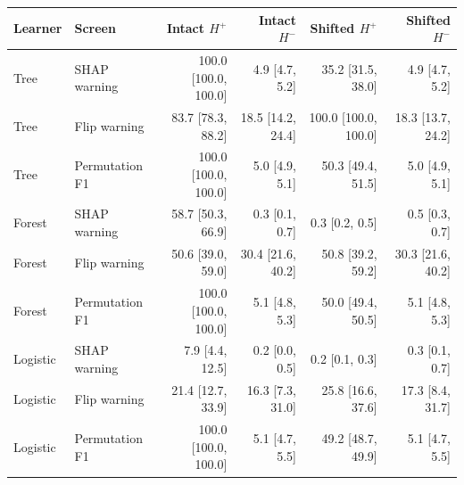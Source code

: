 \begin{tabular}{llrrrr}
\toprule
Learner & Screen & Intact $H^+$ & Intact $H^-$ & Shifted $H^+$ & Shifted $H^-$ \\
\midrule
Tree & SHAP warning & 100.0 [100.0, 100.0] & 4.9 [4.7, 5.2] & 35.2 [31.5, 38.0] & 4.9 [4.7, 5.2] \\
Tree & Flip warning & 83.7 [78.3, 88.2] & 18.5 [14.2, 24.4] & 100.0 [100.0, 100.0] & 18.3 [13.7, 24.2] \\
Tree & Permutation F1 & 100.0 [100.0, 100.0] & 5.0 [4.9, 5.1] & 50.3 [49.4, 51.5] & 5.0 [4.9, 5.1] \\
Forest & SHAP warning & 58.7 [50.3, 66.9] & 0.3 [0.1, 0.7] & 0.3 [0.2, 0.5] & 0.5 [0.3, 0.7] \\
Forest & Flip warning & 50.6 [39.0, 59.0] & 30.4 [21.6, 40.2] & 50.8 [39.2, 59.2] & 30.3 [21.6, 40.2] \\
Forest & Permutation F1 & 100.0 [100.0, 100.0] & 5.1 [4.8, 5.3] & 50.0 [49.4, 50.5] & 5.1 [4.8, 5.3] \\
Logistic & SHAP warning & 7.9 [4.4, 12.5] & 0.2 [0.0, 0.5] & 0.2 [0.1, 0.3] & 0.3 [0.1, 0.7] \\
Logistic & Flip warning & 21.4 [12.7, 33.9] & 16.3 [7.3, 31.0] & 25.8 [16.6, 37.6] & 17.3 [8.4, 31.7] \\
Logistic & Permutation F1 & 100.0 [100.0, 100.0] & 5.1 [4.7, 5.5] & 49.2 [48.7, 49.9] & 5.1 [4.7, 5.5] \\
\bottomrule
\end{tabular}

